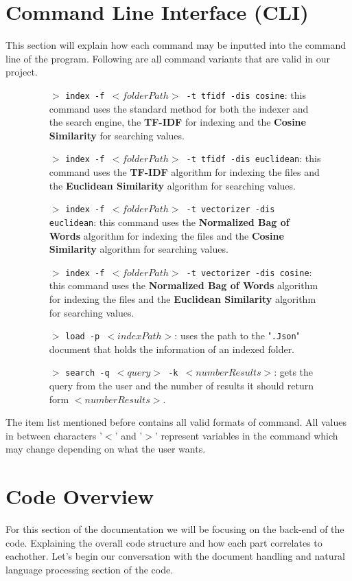 \documentclass{article}
\begin{document}
\section{Command Line Interface (CLI)}
This section will explain how each command may be inputted into the command line of the program. Following are all command variants that are valid in our project.
\begin{figure}[H]
\begin{itemize}
    \item[$>$] \texttt{index -f $<folderPath>$ -t tfidf -dis cosine}: this command uses the standard method for both the indexer and the search engine, the \textbf{TF-IDF} for indexing and the \textbf{Cosine Similarity} for searching values. 
    \item[$>$] \texttt{index -f $<folderPath>$ -t tfidf -dis euclidean}: this command uses the \textbf{TF-IDF} algorithm for indexing the files and the \textbf{Euclidean Similarity} algorithm for searching values. 
    \item[$>$] \texttt{index -f $<folderPath>$ -t vectorizer -dis euclidean}: this command uses the \textbf{Normalized Bag of Words} algorithm for indexing the files and the \textbf{Cosine Similarity} algorithm for searching values. 
    \item[$>$] \texttt{index -f $<folderPath>$ -t vectorizer -dis cosine}: this command uses the \textbf{Normalized Bag of Words} algorithm for indexing the files and the \textbf{Euclidean Similarity} algorithm for searching values. 
    \item[$>$] \texttt{load -p $<indexPath>$}: uses the path to the "\texttt{.Json}" document that holds the information of an indexed folder.  
    \item[$>$] \texttt{search -q $<query>$ -k $<numberResults>$}: gets the query from the user and the number of results it should return form $<numberResults>$. 
\end{itemize}
\label{fig:Commands}
\end{figure}

The item list mentioned before contains all valid formats of command. All values in between characters '$<$' and '$>$' represent variables in the command which may change depending on what the user wants.

\section{Code Overview}
For this section of the documentation we will be focusing on the back-end of the code. Explaining the overall code structure and how each part correlates to eachother. Let's begin our conversation with the document handling and natural language processing section of the code.
\end{document}
